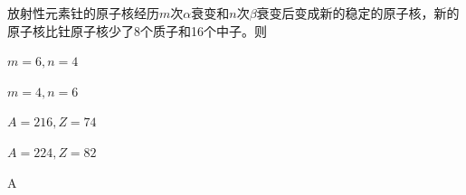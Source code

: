放射性元素钍的原子核经历\(m\)次\(\alpha\)衰变和\(n\)次\(\beta\)衰变后变成新的稳定的原子核，新的原子核比钍原子核少了8个质子和16个中子。则\paren[]
\begin{choices}
    \item \(m = 6 ,n = 4\)
    \item \(m = 4,n = 6\)
    \item \(A = 216,Z = 74\)
    \item \(A = 224,Z = 82\)
\end{choices}
\begin{answer}
    A
\end{answer}